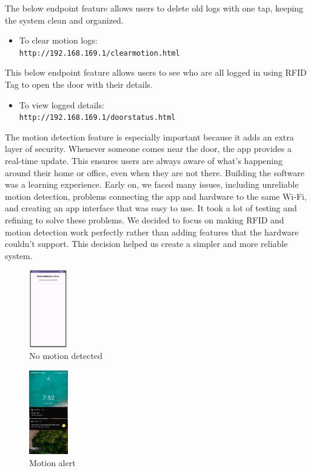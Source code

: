 \documentclass[USenglish,oneside,twocolumn]{article}
\begin{document}
The below endpoint feature allows users to delete old logs with one tap, keeping the system clean and organized.
\begin{itemize}
    \item To clear motion logs:\\
    \texttt{http://192.168.169.1/clearmotion.html}
\end{itemize}

This below endpoint feature allows users to see who are all logged in using RFID Tag to open the door with their details.
\begin{itemize}
    \item To view logged details:\\
    \texttt{http://192.168.169.1/doorstatus.html}
\end{itemize}


The motion detection feature is especially important because it adds an extra layer of security. Whenever someone comes near the door, the app provides a real-time update. This ensures users are always aware of what’s happening around their home or office, even when they are not there. Building the software was a learning experience. Early on, we faced many issues, including unreliable motion detection, problems connecting the app and hardware to the same Wi-Fi, and creating an app interface that was easy to use. It took a lot of testing and refining to solve these problems. We decided to focus on making RFID and motion detection work perfectly rather than adding features that the hardware couldn’t support. This decision helped us create a simpler and more reliable system.

\begin{figure}[h!]
    \centering
    \includegraphics[width=0.15\textwidth]{no motion.JPG}
    \caption{ No motion detected}
    \label{fig:no motion}
\end{figure}


\begin{figure}[h!]
    \centering
    \includegraphics[width=0.15\textwidth]{motion notification.jpg}
    \caption{ Motion alert}
    \label{fig:motion alert}
\end{figure}
\end{document}
